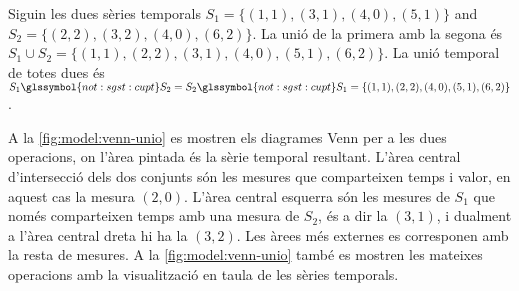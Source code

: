 \begin{example}\label{ex:model:s1s2}
  Siguin les dues sèries temporals $S_1=\{(1,1),(3,1),(4,0),(5,1)\}$
  and $S_2=\{(2,2),(3,2),(4,0),(6,2)\}$.  La unió de la primera amb la
  segona és $S_1 \cup S_2 = \{(1,1),(2,2), (3,1),
  (4,0),(5,1),(6,2)\}$. La unió temporal de totes dues és $S_1
  \glssymbol{not:sgst:cupt} S_2 = S_2 \glssymbol{not:sgst:cupt} S_1 =
  \{(1,1),(2,2),(4,0),(5,1),(6,2)\}$. %

  A la \autoref{fig:model:venn-unio} es mostren els diagrames Venn per
  a les dues operacions, on l'àrea pintada és la sèrie temporal
  resultant. L'àrea central d'intersecció dels dos conjunts són les
  mesures que comparteixen temps i valor, en aquest cas la mesura
  $(2,0)$. L'àrea central esquerra són les mesures de $S_1$ que només
  comparteixen temps amb una mesura de $S_2$, és a dir la $(3,1)$, i
  dualment a l'àrea central dreta hi ha la $(3,2)$. Les àrees més
  externes es corresponen amb la resta de mesures.  A la
  \autoref{fig:model:venn-unio} també es mostren les mateixes
  operacions amb la visualització en taula de les sèries temporals.

  \begin{figure}
    \centering 
    


\end{figure}
\end{example}
